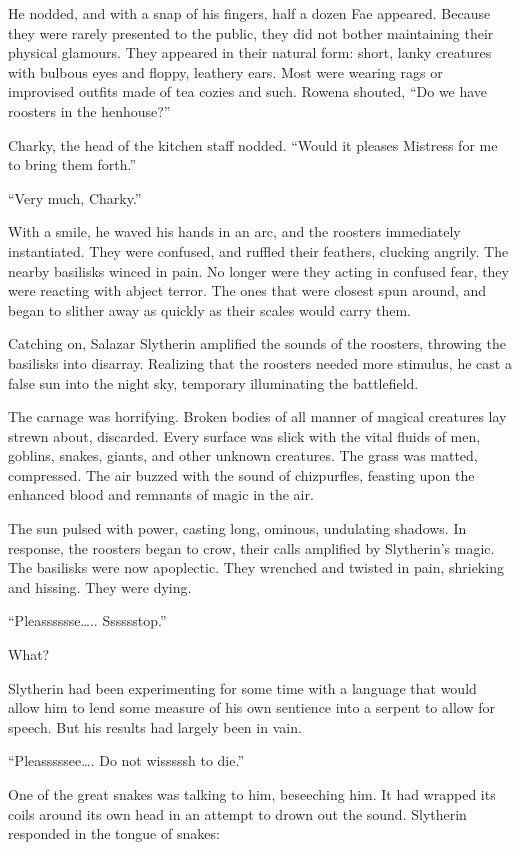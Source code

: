 He nodded, and with a snap of his fingers, half a dozen Fae appeared. Because they were rarely presented to the public, they did not bother maintaining their physical glamours. They appeared in their natural form: short, lanky creatures with bulbous eyes and floppy, leathery ears. Most were wearing rags or improvised outfits made of tea cozies and such. Rowena shouted, “Do we have roosters in the henhouse?”

Charky, the head of the kitchen staff nodded. “Would it pleases Mistress for me to bring them forth.”

“Very much, Charky.”

With a smile, he waved his hands in an arc, and the roosters immediately instantiated. They were confused, and ruffled their feathers, clucking angrily. The nearby basilisks winced in pain. No longer were they acting in confused fear, they were reacting with abject terror. The ones that were closest spun around, and began to slither away as quickly as their scales would carry them.

Catching on, Salazar Slytherin amplified the sounds of the roosters, throwing the basilisks into disarray. Realizing that the roosters needed more stimulus, he cast a false sun into the night sky, temporary illuminating the battlefield.

The carnage was horrifying. Broken bodies of all manner of magical creatures lay strewn about, discarded. Every surface was slick with the vital fluids of men, goblins, snakes, giants, and other unknown creatures. The grass was matted, compressed. The air buzzed with the sound of chizpurfles, feasting upon the enhanced blood and remnants of magic in the air.

The sun pulsed with power, casting long, ominous, undulating shadows. In response, the roosters began to crow, their calls amplified by Slytherin’s magic. The basilisks were now apoplectic. They wrenched and twisted in pain, shrieking and hissing. They were dying.

“Pleasssssse….. Sssssstop.”

What?

Slytherin had been experimenting for some time with a language that would allow him to lend some measure of his own sentience into a serpent to allow for speech. But his results had largely been in vain.

“Pleasssssee…. Do not wisssssh to die.”

One of the great snakes was talking to him, beseeching him. It had wrapped its coils around its own head in an attempt to drown out the sound. Slytherin responded in the tongue of snakes:

